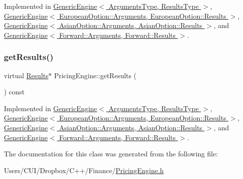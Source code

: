 Implemented in \hyperlink{class_generic_engine_ac2adcbbc8d7b554e2cc1f90e4c4d055d}{Generic\+Engine$<$ Arguments\+Type, Results\+Type $>$}, \hyperlink{class_generic_engine_ac2adcbbc8d7b554e2cc1f90e4c4d055d}{Generic\+Engine$<$ European\+Option\+::\+Arguments, European\+Option\+::\+Results $>$}, \hyperlink{class_generic_engine_ac2adcbbc8d7b554e2cc1f90e4c4d055d}{Generic\+Engine$<$ Asian\+Option\+::\+Arguments, Asian\+Option\+::\+Results $>$}, and \hyperlink{class_generic_engine_ac2adcbbc8d7b554e2cc1f90e4c4d055d}{Generic\+Engine$<$ Forward\+::\+Arguments, Forward\+::\+Results $>$}.

\hypertarget{class_pricing_engine_a73e2852ef4c28e92a402492e86717d0b}{}\label{class_pricing_engine_a73e2852ef4c28e92a402492e86717d0b} 
\subsubsection{\texorpdfstring{get\+Results()}{getResults()}}
{\footnotesize\ttfamily virtual \hyperlink{class_pricing_engine_1_1_results}{Results}$\ast$ Pricing\+Engine\+::get\+Results (\begin{DoxyParamCaption}{ }\end{DoxyParamCaption}) const\hspace{0.3cm}{\ttfamily [pure virtual]}}



Implemented in \hyperlink{class_generic_engine_a2b8d7fba7e51c0795ea9f1e9c2f54afd}{Generic\+Engine$<$ Arguments\+Type, Results\+Type $>$}, \hyperlink{class_generic_engine_a2b8d7fba7e51c0795ea9f1e9c2f54afd}{Generic\+Engine$<$ European\+Option\+::\+Arguments, European\+Option\+::\+Results $>$}, \hyperlink{class_generic_engine_a2b8d7fba7e51c0795ea9f1e9c2f54afd}{Generic\+Engine$<$ Asian\+Option\+::\+Arguments, Asian\+Option\+::\+Results $>$}, and \hyperlink{class_generic_engine_a2b8d7fba7e51c0795ea9f1e9c2f54afd}{Generic\+Engine$<$ Forward\+::\+Arguments, Forward\+::\+Results $>$}.



The documentation for this class was generated from the following file\+:\begin{DoxyCompactItemize}
\item 
Users/\+C\+U\+I/\+Dropbox/\+C++/\+Finance/\hyperlink{_pricing_engine_8h}{Pricing\+Engine.\+h}\end{DoxyCompactItemize}
